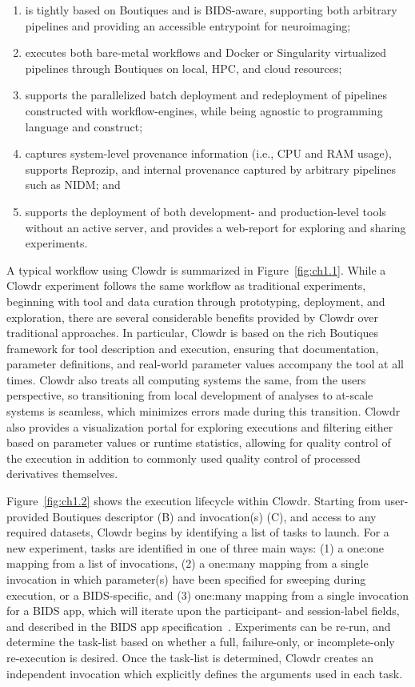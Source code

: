\documentclass[fleqn,12pt]{SelfArx_ch} %
\begin{document}
\begin{enumerate}[label=\roman*]
\item is tightly based on Boutiques and is BIDS-aware, supporting both arbitrary pipelines and providing an accessible
entrypoint for neuroimaging;
\item executes both bare-metal workflows and Docker or Singularity virtualized pipelines through Boutiques on local,
HPC, and cloud resources;
\item supports the parallelized batch deployment and redeployment of pipelines constructed with workflow-engines, while
being agnostic to programming language and construct;
\item captures system-level provenance information (i.e., CPU and RAM usage), supports Reprozip, and internal
provenance captured by arbitrary pipelines such as NIDM; and
\item supports the deployment of both development- and production-level tools without an active server, and provides a
web-report for exploring and sharing experiments.
\end{enumerate}

A typical workflow using Clowdr is summarized in Figure~\ref{fig:ch1.1}. While a Clowdr experiment follows the same
workflow as traditional experiments, beginning with tool and data curation through prototyping, deployment, and
exploration, there are several considerable benefits provided by Clowdr over traditional approaches. In particular,
Clowdr is based on the rich Boutiques framework for tool description and execution, ensuring that documentation,
parameter definitions, and real-world parameter values accompany the tool at all times. Clowdr also treats all
computing systems the same, from the users perspective, so transitioning from local development of analyses to at-scale
systems is seamless, which minimizes errors made during this transition. Clowdr also provides a visualization portal
for exploring executions and filtering either based on parameter values or runtime statistics, allowing for quality
control of the execution in addition to commonly used quality control of processed derivatives themselves.

Figure~\ref{fig:ch1.2} shows the execution lifecycle within Clowdr. Starting from user-provided Boutiques descriptor
(B) and invocation(s) (C), and access to any required datasets, Clowdr begins by identifying a list of tasks to launch.
For a new experiment, tasks are identified in one of three main ways: (1) a one:one mapping from a list of invocations,
(2) a one:many mapping from a single invocation in which parameter(s) have been specified for sweeping during
execution, or a BIDS-specific, and (3) one:many mapping from a single invocation for a BIDS app, which will iterate
upon the participant- and session-label fields, and described in the BIDS app specification~\cite{Gorgolewski2017-sr}.
Experiments can be re-run, and determine the task-list based on whether a full, failure-only, or incomplete-only
re-execution is desired. Once the task-list is determined, Clowdr creates an independent invocation which explicitly
defines the arguments used in each task.
\end{document}
